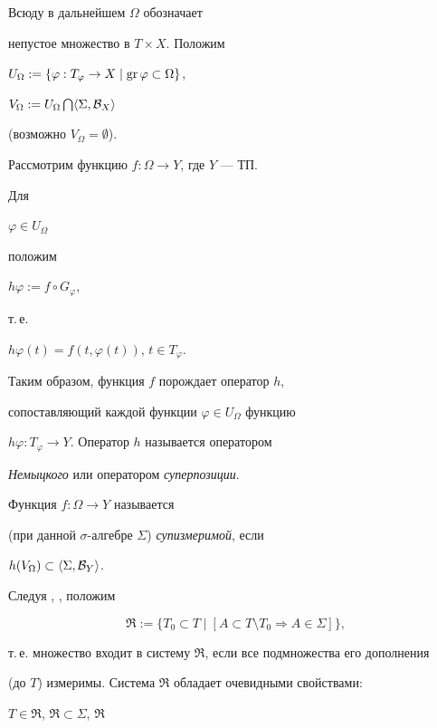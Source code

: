 Всюду в дальнейшем $\Omega$ \sloppy обозначает


непустое множество в $T\times X$. Положим


$U_\Omega:=\{\varphi:T_{\varphi}\to X\mid \operatorname{gr}\varphi\subset\Omega\}$,


$V_\Omega:=U_\Omega\bigcap\langle\Sigma,{\cal B}_X\rangle$


(возможно $V_\Omega=\emptyset$).





Рассмотрим функцию $f:\Omega\to Y$, где $Y$ --- ТП.


Для


$\varphi\in U_\Omega$


положим


$h\varphi:=f\circ G_{\varphi}$,


т.\,е.


$h\varphi (t)=f(t,\varphi(t))$, $t\in T_{\varphi}$.


Таким образом, функция $f$ порождает оператор $h$,


сопоставляющий каждой функции $\varphi\in U_\Omega$ функцию


$h\varphi:T_\varphi\to Y$. Оператор $h$ называется оператором


{\em Немыцкого} или оператором {\em суперпозиции}.





\begin{defns} Функция $f:\Omega\to Y$ называется \cite{Kra}


(при данной $\sigma$-алгебре $\Sigma$) {\em супизмеримой}, если


$h(V_\Omega)\subset\langle \Sigma ,{\cal B}_Y\rangle$.


\end{defns}





Следуя \cite{Sh1}, \cite{Sh2}, положим


$$


\Re :=\{T_0\subset T\mid [A\subset T\setminus


T_0\Rightarrow A\in\Sigma]\},


$$


т.\,е. множество входит в систему $\Re$, если все подмножества его дополнения


(до $T$) измеримы. Система $\Re$ обладает очевидными свойствами:


$T\in\Re$, $\Re\subset\Sigma$, $\Re$


